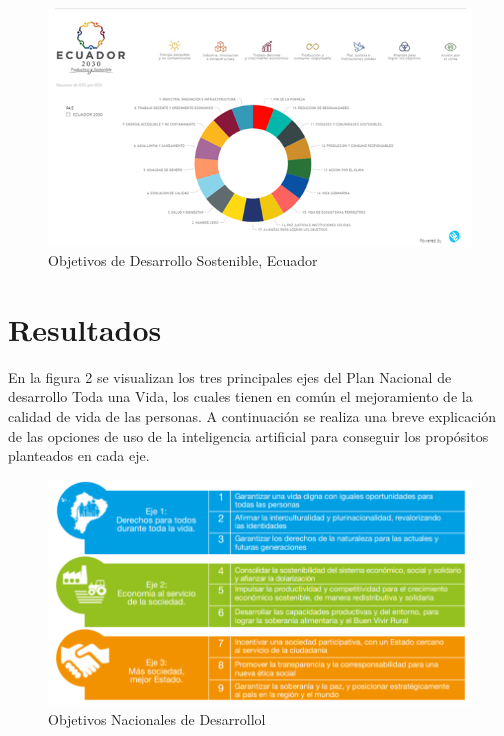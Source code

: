 \documentclass[preprint,12pt,3p]{elsarticle}
\begin{document}
\begin{figure}
    \centering
    \includegraphics{objetivos.png}
    \caption{\label{Figura 1}{Objetivos de Desarrollo Sostenible, Ecuador}}
\end{figure}


\section{Resultados}
\label{sec5} 
En la figura 2 se visualizan los tres principales ejes del Plan Nacional de desarrollo Toda una Vida, los cuales tienen en común el mejoramiento de la calidad de vida de las personas. A continuación se realiza una breve explicación de las opciones de uso de la inteligencia artificial para conseguir los propósitos planteados en cada eje.\\

\begin{figure}
    \centering
    \includegraphics{toda una vida.png}
    \caption{\label{Figura 2}{Objetivos Nacionales de Desarrollol}}
\end{figure}
\end{document}
